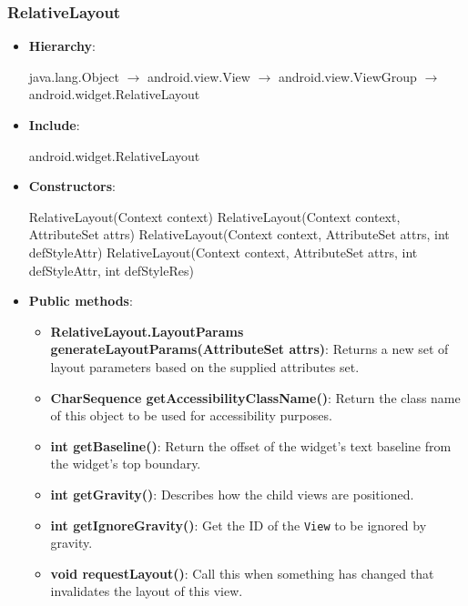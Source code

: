 \documentclass{report}
\begin{document}
    \subsubsection{RelativeLayout}
    \begin{itemize}
        \item \textbf{Hierarchy}:
            \begin{center}
                java.lang.Object $\to$ android.view.View $\to$	android.view.ViewGroup $\to$	android.widget.RelativeLayout
            \end{center}
        \item \textbf{Include}:
            \bigbreak \noindent 
            \begin{javacode}
                android.widget.RelativeLayout    
            \end{javacode}
        \item \textbf{Constructors}: 
            \bigbreak \noindent 
            \begin{javacode}
                RelativeLayout(Context context)
                RelativeLayout(Context context, AttributeSet attrs)
                RelativeLayout(Context context, AttributeSet attrs, int defStyleAttr)
                RelativeLayout(Context context, AttributeSet attrs, int defStyleAttr, int defStyleRes)
            \end{javacode}
        \item \textbf{Public methods}:
            \begin{itemize}
                \item \textbf{RelativeLayout.LayoutParams generateLayoutParams(AttributeSet attrs)}: Returns a new set of layout parameters based on the supplied attributes set.
                \item \textbf{CharSequence getAccessibilityClassName()}: Return the class name of this object to be used for accessibility purposes.
                \item \textbf{int getBaseline()}: Return the offset of the widget's text baseline from the widget's top boundary.
                \item \textbf{int getGravity()}: Describes how the child views are positioned.
                \item \textbf{int getIgnoreGravity()}: Get the ID of the \texttt{View} to be ignored by gravity.
                \item \textbf{void requestLayout()}: Call this when something has changed that invalidates the layout of this view.

\end{itemize}
\end{itemize}
\end{document}
